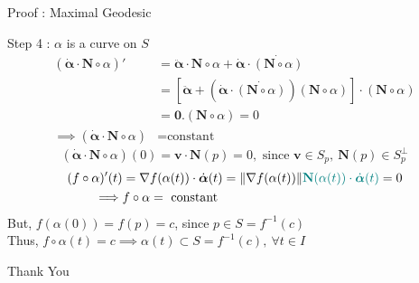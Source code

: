 \documentclass{beamer}
\begin{document}
\begin{frame}{Proof : Maximal Geodesic}
\begin{block}{Step 4 : $\alpha$ is a curve on $S$}
\begin{align*}
	(\dot{\boldsymbol{\alpha}} \cdot \mathbf{N} \circ \alpha)' & = \ddot{\boldsymbol{\alpha}} \cdot \mathbf{N} \circ \alpha + \dot{\boldsymbol{\alpha}} \cdot \dot{(\mathbf{N} \circ \alpha)} \\
	& = \left[ \ddot{\boldsymbol{\alpha}} + (\dot{\boldsymbol{\alpha}} \cdot \dot{(\mathbf{N}\circ \alpha)})(\mathbf{N} \circ \alpha) \right] \cdot (\mathbf{N} \circ \alpha) \\
	& = \mathbf{0} . (\mathbf{N} \circ \alpha)  = 0 \\
	\implies (\dot{\boldsymbol{\alpha}} \cdot \mathbf{N} \circ \alpha) & = \text{constant} 
\end{align*}
	$$(\dot{\boldsymbol{\alpha}} \cdot \mathbf{N} \circ \alpha)(0) = \mathbf{v} \cdot \mathbf{N}(p)  = 0, \text{ since } \mathbf{v} \in S_p,\ \mathbf{N}(p) \in S_p^\perp$$
\begin{align*}
	(f \circ \alpha)'(t)  & = \nabla f(\alpha(t)) \cdot \dot{\boldsymbol{\alpha}}(t) = \|\nabla f(\alpha(t)) \|{\color{teal} \mathbf{N}(\alpha(t)) \cdot \dot{\boldsymbol{\alpha}}(t)} = 0\\
	\implies & f \circ \alpha  = \text{ constant }
\end{align*}
	But, $f(\alpha(0)) = f(p) = c$, since $p \in S = f^{-1}(c)$\\
	Thus, $f \circ \alpha(t) = c \implies \alpha(t) \subset S = f^{-1}(c),\ \forall t \in I$
\end{block}
\end{frame}
\begin{frame}
	\vspace{0.6in}
	\hspace{3cm} {\color{blue}\Huge{Thank You}}
\end{frame}
\end{document}

